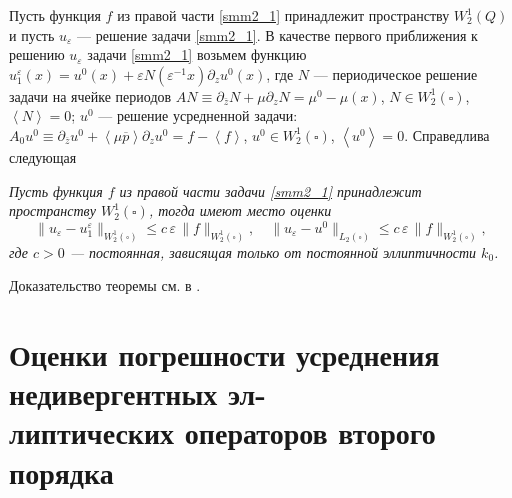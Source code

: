  Пусть функция $f$ из правой части \eqref{smm2_1} принадлежит пространству $W_2^1(Q)$
и пусть $u_\varepsilon$ --- решение задачи \eqref{smm2_1}.
В качестве первого приближения к решению $u_\varepsilon$  задачи  \eqref{smm2_1} возьмем   функцию
$
u_1^\varepsilon(x)=u^0(x)+\varepsilon N(\varepsilon^{-1}x)\partial_zu^0(x)$,
где $N$ --- периодическое решение задачи на ячейке периодов
$AN\equiv \partial_{\bar z}N+\mu\partial_z N=\mu^0-\mu(x)$,
$N\in W_2^{1}(\square)$, $\left\langle N\right\rangle=0$; $u^0$ --- решение усредненной задачи: $A_0u^0\equiv \partial_{\overline z}u^0+\left\langle\mu\overline p\right\rangle\partial_zu^0=f-\left\langle f\right\rangle$, $u^0\in W_2^1(\square)$,
$\left\langle u^0\right\rangle=0$. Справедлива следующая

\smallskip

\begin{theorem}
\textit{Пусть функция  $f$ из  правой части задачи \eqref{smm2_1} принадлежит пространству $W^1_2(\square)$,  тогда имеют место оценки
$$
\|u_\varepsilon-u_1^\varepsilon\|_{W^1_2(\square)}\leqslant c\,\varepsilon\,\|f\|_{W^1_2(\square)},\quad
\|u_\varepsilon-u^0\|_{L_2(\square)}\leqslant c\,\varepsilon\,\|f\|_{W^1_2(\square)},
$$
где $c>0$ --- постоянная, зависящая только от постоянной эллиптичности $k_0$.}
\end{theorem}

Доказательство теоремы см. в \cite{smm_SS}.









\chapter{Оценки погрешности усреднения недивергентных
эл-\\липтических операторов второго порядка}


